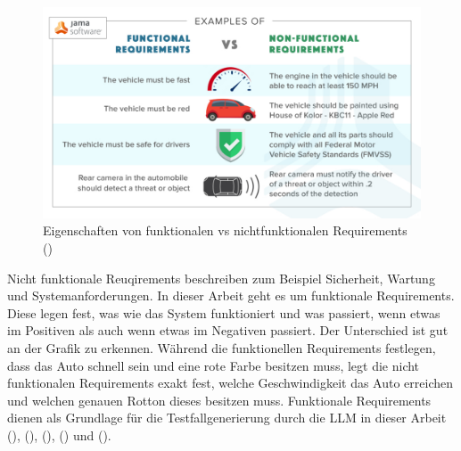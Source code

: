\documentclass[12pt,toc=bib,toc=listof]{scrreprt}
\begin{document}
\begin{figure}[H]
    \centering
    \includegraphics[width=0.75\linewidth]{./Bilder/Jama Software_Eigenschaften von funktionalen vs nichtfunktionalen Requirements.jpg}
    \caption{Eigenschaften von funktionalen vs nichtfunktionalen Requirements (\cite{JamaSoftware2024})}
    \label{fig:enter-label}
\end{figure}
\noindent Nicht funktionale Reuqirements beschreiben zum Beispiel Sicherheit, Wartung und Systemanforderungen. In dieser Arbeit geht es um funktionale Requirements. Diese legen fest, was wie das System funktioniert und was passiert, wenn etwas im Positiven als auch wenn etwas im Negativen passiert. Der Unterschied ist gut an der Grafik zu erkennen. Während die funktionellen Requirements festlegen, dass das Auto schnell sein und eine rote Farbe besitzen muss, legt die nicht funktionalen Requirements exakt fest, welche Geschwindigkeit das Auto erreichen und welchen genauen Rotton dieses besitzen muss. Funktionale Requirements dienen als Grundlage für die Testfallgenerierung durch die LLM in dieser Arbeit (\cite{Aysolmaz2018}), (\cite{Barmi2011}), (\cite{JamaSoftware2024}), (\cite{Mustafa2021}) und (\cite{Visure2024}).
\end{document}
